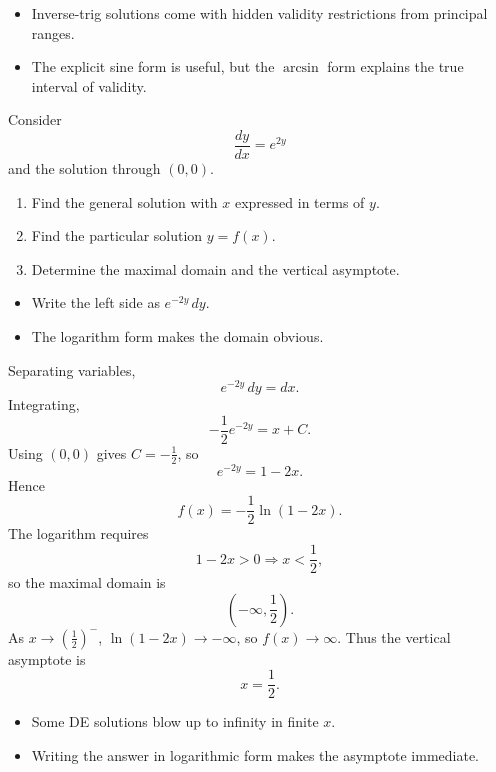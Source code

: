 \begin{takeaways}
\begin{itemize}[leftmargin=*]
    \item Inverse-trig solutions come with hidden validity restrictions from principal ranges.
    \item The explicit sine form is useful, but the $\arcsin$ form explains the true interval of validity.
\end{itemize}
\end{takeaways}

\begin{problem}
Consider
\[
\frac{dy}{dx}=e^{2y}
\]
and the solution through $(0,0)$.
\begin{enumerate}
    \item[\textbf{i}] Find the general solution with $x$ expressed in terms of $y$.
    \item[\textbf{ii}] Find the particular solution $y=f(x)$.
    \item[\textbf{iii}] Determine the maximal domain and the vertical asymptote.
\end{enumerate}
\end{problem}

\begin{hint}
\begin{itemize}[leftmargin=*]
    \item Write the left side as $e^{-2y}\,dy$.
    \item The logarithm form makes the domain obvious.
\end{itemize}
\end{hint}

\begin{solution}
Separating variables,
\[
e^{-2y}\,dy=dx.
\]
Integrating,
\[
-\frac12e^{-2y}=x+C.
\]
Using $(0,0)$ gives $C=-\frac12$, so
\[
e^{-2y}=1-2x.
\]
Hence
\[
\boxed{f(x)=-\frac12\ln(1-2x)}.
\]
The logarithm requires
\[
1-2x>0 \Rightarrow x<\frac12,
\]
so the maximal domain is
\[
\boxed{\left(-\infty,\frac12\right)}.
\]
As $x\to\left(\frac12\right)^-$, $\ln(1-2x)\to-\infty$, so $f(x)\to\infty$. Thus the vertical asymptote is
\[
\boxed{x=\frac12}.
\]
\end{solution}

\begin{takeaways}
\begin{itemize}[leftmargin=*]
    \item Some DE solutions blow up to infinity in finite $x$.
    \item Writing the answer in logarithmic form makes the asymptote immediate.
\end{itemize}
\end{takeaways}

